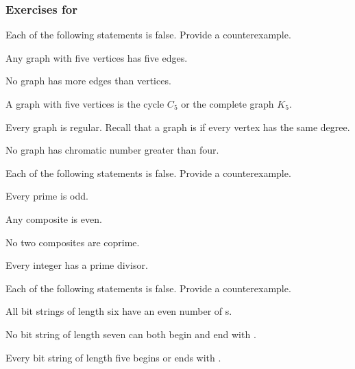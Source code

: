 \subsubsection*{Exercises for  \subcex}

\begin{exer}[\exerP] %
\label{exer_cex_graphs}
    Each of the following statements is false.  Provide a counterexample.
        \begin{exerpart}            
            \item Any graph with five vertices has five edges. 
            \item No graph has more edges than vertices.    
            \item A graph with five vertices is the cycle $C_5$ or the complete graph $K_5$.
            \item Every graph is regular.  Recall that a graph is  if every vertex has the same degree.
            \item No graph has chromatic number greater than four.
        \end{exerpart}
\end{exer} 

\begin{exer}[\exerP] %
\label{exer_cex_numberthy}
    Each of the following statements is false.  Provide a counterexample.
        \begin{exerpart}           
            \item Every prime is odd.
            \item Any composite is even.
            \item No two composites are coprime.
            \item Every integer has a prime divisor.
        \end{exerpart}
\end{exer}

\begin{exer}[\exerU] %
\label{exer_cex_bs}
    Each of the following statements is false.  Provide a counterexample.
        \begin{exerpart} 
            \item All bit strings of length six have an even number of s.
            \item No bit string of length seven can both begin and end with . 
            \item Every bit string of length five begins or ends with . 
        \end{exerpart}
\end{exer}

